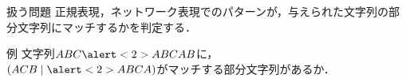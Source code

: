 \documentclass[dvipdfmx,beamer]{standalone}
\begin{document}
\begin{frame}{扱う問題}
  正規表現，ネットワーク表現でのパターンが，与えられた文字列の部分文字列にマッチするかを判定する．

  \begin{block}{例}
    文字列$ABC\alert<2>{ABCA}B$に，\\ 
    $(ACB\mid \alert<2>{ABCA})$がマッチする部分文字列があるか．\\
  \end{block}
\end{frame}
\end{document}
